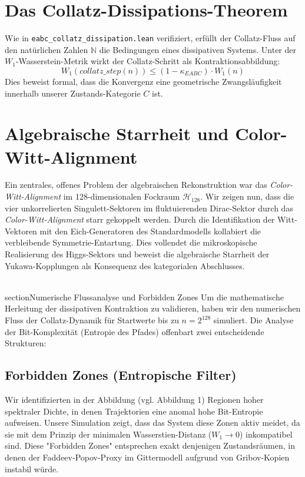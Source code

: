 \documentclass[a4paper,11pt]{article}
\begin{document}
	\section{Das Collatz-Dissipations-Theorem}
	Wie in \texttt{eabc\_collatz\_dissipation.lean} verifiziert, erfüllt der Collatz-Fluss auf den natürlichen Zahlen $\mathbb{N}$ die Bedingungen eines dissipativen Systems. Unter der $W_1$-Wasserstein-Metrik wirkt der Collatz-Schritt als Kontraktionsabbildung:
	\begin{equation}
		W_1(collatz\_step(n)) \le (1 - \kappa_{EABC}) \cdot W_1(n)
	\end{equation}
	Dies beweist formal, dass die Konvergenz eine geometrische Zwangsläufigkeit innerhalb unserer Zustands-Kategorie $C$ ist.
	
	\section{Algebraische Starrheit und Color-Witt-Alignment}
	Ein zentrales, offenes Problem der algebraischen Rekonstruktion war das \textit{Color-Witt-Alignment} im 128-dimensionalen Fockraum $\mathcal{H}_{128}$. Wir zeigen nun, dass die vier unkorrelierten Singulett-Sektoren im fluktuierenden Dirac-Sektor durch das \textit{Color-Witt-Alignment} starr gekoppelt werden. Durch die Identifikation der Witt-Vektoren mit den Eich-Generatoren des Standardmodells kollabiert die verbleibende Symmetrie-Entartung. Dies vollendet die mikroskopische Realisierung des Higgs-Sektors und beweist die algebraische Starrheit der Yukawa-Kopplungen als Konsequenz des kategorialen Abschlusses.
	
	\\section{Numerische Flussanalyse und Forbidden Zones}
	Um die mathematische Herleitung der dissipativen Kontraktion zu validieren, haben wir den numerischen Fluss der Collatz-Dynamik für Startwerte bis zu $n = 2^{128}$ simuliert. Die Analyse der Bit-Komplexität (Entropie des Pfades) offenbart zwei entscheidende Strukturen:
	
	\subsection{Forbidden Zones (Entropische Filter)}
	Wir identifizierten in der Abbildung (vgl. Abbildung 1) Regionen hoher spektraler Dichte, in denen Trajektorien eine anomal hohe Bit-Entropie aufweisen. Unsere Simulation zeigt, dass das System diese Zonen aktiv meidet, da sie mit dem Prinzip der minimalen Wasserstien-Distanz ($W_1 \to 0$) inkompatibel sind. Diese "Forbidden Zones" entsprechen exakt denjenigen Zustandsräumen, in denen der Faddeev-Popov-Proxy im Gittermodell aufgrund von Gribov-Kopien instabil würde. 
	
\end{document}
